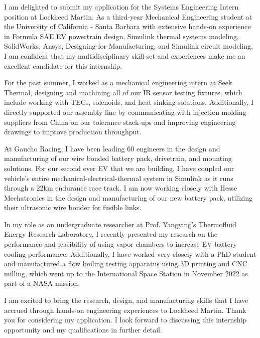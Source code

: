 \documentclass[11pt, letterpaper]{awesome-cv} %
\begin{document}
\makecvheader %

\makelettertitle %


\begin{cvletter}


I am delighted to submit my application for the Systems Engineering Intern position at Lockheed Martin. As a third-year Mechanical Engineering student at the University of California - Santa Barbara with extensive hands-on experience in Formula SAE EV powertrain design, Simulink thermal systems modeling, SolidWorks, Ansys, Designing-for-Manufacturing, and Simulink circuit modeling, I am confident that my multidisciplinary skill-set and experiences make me an excellent candidate for this internship.

For the past summer, I worked as a mechanical engineering intern at Seek Thermal, designing and machining all of our IR sensor testing fixtures, which include working with TECs, solenoids, and heat sinking solutions. Additionally, I directly supported our assembly line by communicating with injection molding suppliers from China on our tolerance stack-ups and improving engineering drawings to improve production throughput. 

At Gaucho Racing, I have been leading 60 engineers in the design and manufacturing of our wire bonded battery pack, drivetrain, and mounting solutions. For our second ever EV that we are building, I have coupled our vehicle's entire mechanical-electrical-thermal system in Simulink as it runs through a 22km endurance race track. I am now working closely with Hesse Mechatronics in the design and manufacturing of our new battery pack, utilizing their ultrasonic wire bonder for fusible links. 

In my role as an undergraduate researcher at Prof. Yangying's Thermofluid Energy Research Laboratory, I recently presented my research on the performance and feasibility of using vapor chambers to increase EV battery cooling performance. Additionally, I have worked very closely with a PhD student and manufactured a flow boiling testing apparatus using 3D printing and CNC milling, which went up to the International Space Station in November 2022 as part of a NASA mission. 

I am excited to bring the research, design, and manufacturing skills that I have accrued through hands-on engineering experiences to Lockheed Martin. Thank you for considering my application. I look forward to discussing this internship opportunity and my qualifications in further detail.


\end{cvletter}


\makeletterclosing %
\end{document}
